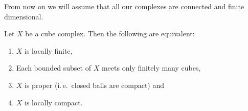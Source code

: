 \begin{rem}
  From now on we will assume that all our complexes are connected and finite dimensional.
\end{rem}

\begin{prop}
  Let \(X\) be a cube complex. Then the following are equivalent:
  \begin{enumerate}
  \item \(X\) is locally finite,
  \item Each bounded subset of \(X\) meets only finitely many cubes,
  \item \(X\) is proper (i.\,e.\ closed balls are compact) and
  \item \(X\) is locally compact.
  \end{enumerate}
\end{prop}

